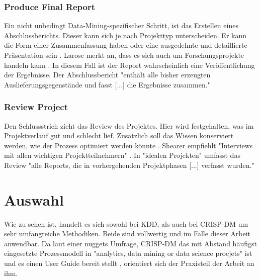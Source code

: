 \subsubsection{Produce Final Report}
Ein nicht unbedingt Data-Mining-spezifischer Schritt, ist das Erstellen eines Abschlussberichts. Dieser kann sich je nach Projekttyp unterscheiden. Er kann die Form einer Zusammenfassung haben oder eine ausgedehnte und detaillierte Präsentation sein . Larose merkt an, dass es sich auch um Forschungsprojekte handeln kann \citep[Punkt 1.4.1.1]{larose_discovering_2014}. In diesem Fall ist der Report wahrscheinlich eine Veröffentlichung der Ergebnisse. Der Abschlussbericht "enthält alle bisher erzeugten Auslieferungsgegenstände und fasst [...] die Ergebnisse zusammen." \citep[S~18; eigene Übersetzung]{shearer_crisp-dm_2000}

\subsubsection{Review Project}
Den Schlussstrich zieht das Review des Projektes. Hier wird festgehalten, was im Projektverlauf gut und schlecht lief. Zusätzlich soll das Wissen konserviert werden, wie der Prozess optimiert werden könnte .
Shearer empfiehlt "Interviews mit allen wichtigen Projektteilnehmern" \citep[S.~18; eigene Übersetzung]{shearer_crisp-dm_2000}. In "idealen Projekten" umfasst das Review "alle Reports, die in vorhergehenden Projektphasen [...] verfasst wurden." \citep[S.~29; eigene Übersetzung]{chapman_crisp-dm_2000}

\section{Auswahl}\label{sec:crispdmdec}
Wie zu sehen ist, handelt es sich sowohl bei KDD, als auch bei CRISP-DM um sehr umfangreiche Methodiken. Beide sind vollwertig und im Falle dieser Arbeit anwendbar. Da laut einer \gls{nuggets} Umfrage, CRISP-DM das mit Abstand häufigst eingesetzte Prozessmodell in "analytics, data mining or data science procjets" ist \citep{piatetsky_crisp-dm_2014} und es einen User Guide bereit stellt \citep[S.~7]{chapman_crisp-dm_2000}, orientiert sich der Praxisteil der Arbeit an ihm.


